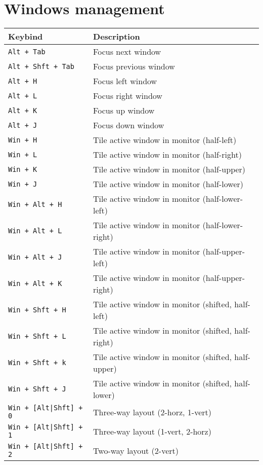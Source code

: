 \documentclass[letterpaper,12pt]{article}
\begin{document}
\section*{Windows management}
\begin{table}[H]
  \begin{tabular}{|C{5cm}|L{10cm}|}
    \hline
    \textbf{Keybind} & \textbf{Description} \\
    \hline
    {\tt Alt + Tab} & Focus next window \\
    {\tt Alt + Shft + Tab} & Focus previous window \\
    {\tt Alt + H} & Focus left window \\
    {\tt Alt + L} & Focus right window \\
    {\tt Alt + K} & Focus up window \\
    {\tt Alt + J} & Focus down window \\
    \hline
    {\tt Win + H} & Tile active window in monitor (half-left) \\
    {\tt Win + L} & Tile active window in monitor (half-right) \\
    {\tt Win + K} & Tile active window in monitor (half-upper) \\
    {\tt Win + J} & Tile active window in monitor (half-lower) \\
    {\tt Win + Alt + H} & Tile active window in monitor (half-lower-left) \\
    {\tt Win + Alt + L} & Tile active window in monitor (half-lower-right) \\
    {\tt Win + Alt + J} & Tile active window in monitor (half-upper-left) \\
    {\tt Win + Alt + K} & Tile active window in monitor (half-upper-right) \\
    {\tt Win + Shft + H} & Tile active window in monitor (shifted, half-left) \\
    {\tt Win + Shft + L} & Tile active window in monitor (shifted, half-right) \\
    {\tt Win + Shft + k} & Tile active window in monitor (shifted, half-upper) \\
    {\tt Win + Shft + J} & Tile active window in monitor (shifted, half-lower) \\
    \hline
    {\tt Win + [Alt|Shft] + 0} & Three-way layout (2-horz, 1-vert) \\
    {\tt Win + [Alt|Shft] + 1} & Three-way layout (1-vert, 2-horz) \\
    {\tt Win + [Alt|Shft] + 2} & Two-way layout (2-vert) \\

\end{tabular}
\end{table}
\end{document}
